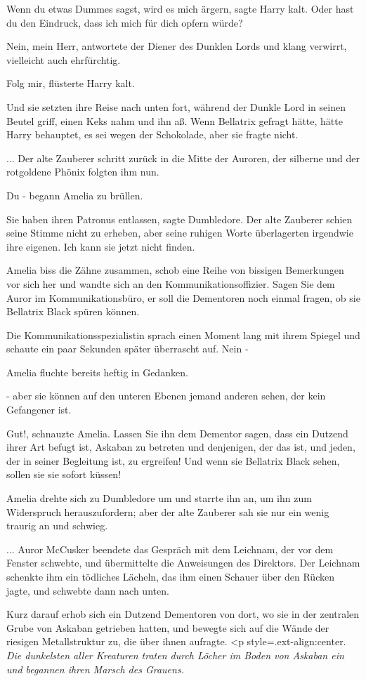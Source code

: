 \glqq{}Wenn du etwas Dummes sagst, wird es mich ärgern\grqq{}, sagte Harry kalt.
\glqq{}Oder hast du den Eindruck, dass ich mich für dich opfern würde?\grqq{}

\glqq{}Nein, mein Herr\grqq{}, antwortete der Diener des Dunklen Lords und klang
verwirrt, vielleicht auch ehrfürchtig.

\glqq{}Folg mir\grqq{}, flüsterte Harry kalt.

Und sie setzten ihre Reise nach unten fort, während der Dunkle Lord in seinen
Beutel griff, einen Keks nahm und ihn aß. Wenn Bellatrix gefragt hätte, hätte
Harry behauptet, es sei wegen der Schokolade, aber sie fragte nicht.

... Der alte Zauberer schritt zurück in die Mitte der Auroren, der silberne und
der rotgoldene Phönix folgten ihm nun.

\glqq{}Du -\grqq{} begann Amelia zu brüllen.

\glqq{}Sie haben ihren Patronus entlassen\grqq{}, sagte Dumbledore. Der alte
Zauberer schien seine Stimme nicht zu erheben, aber seine ruhigen Worte
überlagerten irgendwie ihre eigenen. \glqq{}Ich kann sie jetzt nicht finden.\grqq{}

Amelia biss die Zähne zusammen, schob eine Reihe von bissigen Bemerkungen vor
sich her und wandte sich an den Kommunikationsoffizier. \glqq{}Sagen Sie dem
Auror im Kommunikationsbüro, er soll die Dementoren noch einmal fragen, ob sie
Bellatrix Black spüren können.\grqq{}

Die Kommunikationsspezialistin sprach einen Moment lang mit ihrem Spiegel und
schaute ein paar Sekunden später überrascht auf. \glqq{}Nein -\grqq{}

Amelia fluchte bereits heftig in Gedanken.

\glqq{}- aber sie können auf den unteren Ebenen jemand anderen sehen, der kein
Gefangener ist.\grqq{}

\glqq{}Gut!\grqq{}, schnauzte Amelia. \glqq{}Lassen Sie ihn dem Dementor sagen,
dass ein Dutzend ihrer Art befugt ist, Askaban zu betreten und denjenigen, der
das ist, und jeden, der in seiner Begleitung ist, zu ergreifen! Und wenn sie
Bellatrix Black sehen, sollen sie sie sofort küssen!\grqq{}

Amelia drehte sich zu Dumbledore um und starrte ihn an, um ihn zum Widerspruch
herauszufordern; aber der alte Zauberer sah sie nur ein wenig traurig an und
schwieg.

... Auror McCusker beendete das Gespräch mit dem Leichnam, der vor dem Fenster
schwebte, und übermittelte die Anweisungen des Direktors. Der Leichnam schenkte
ihm ein tödliches Lächeln, das ihm einen Schauer über den Rücken jagte, und
schwebte dann nach unten.

Kurz darauf erhob sich ein Dutzend Dementoren von dort, wo sie in der zentralen
Grube von Askaban getrieben hatten, und bewegte sich auf die Wände der riesigen
Metallstruktur zu, die über ihnen aufragte. <p
style=\grqq{}.ext-align:center\grqq{}. \emph{ Die dunkelsten aller Kreaturen
traten durch Löcher im Boden von Askaban ein und begannen ihren Marsch des
Grauens.}

